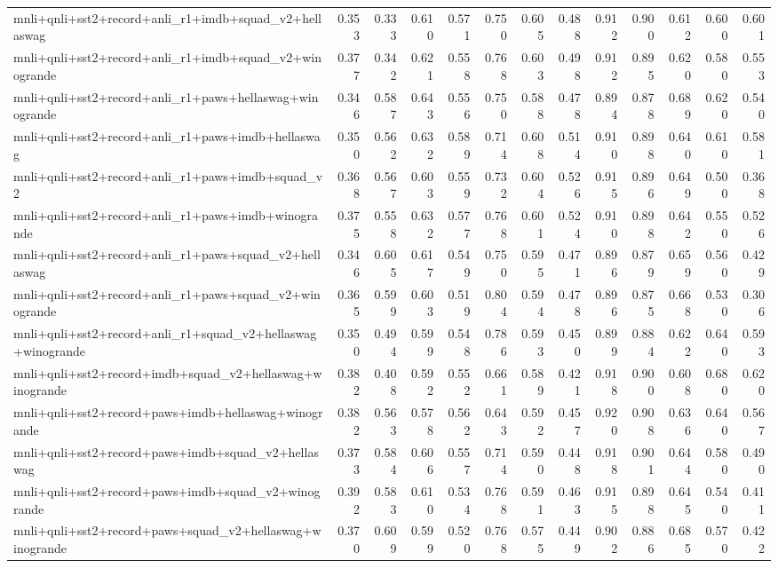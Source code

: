 \begin{table}[t]
\begin{tabular}{lrrrrrrrrrrrr}
    mnli+qnli+sst2+record+anli\_r1+imdb+squad\_v2+hellaswag & 0.353 & 0.333 & 0.610 & 0.571 & 0.750 & 0.605 & 0.488 & 0.912 & 0.900 & 0.612 & 0.600 & 0.601 \\
    mnli+qnli+sst2+record+anli\_r1+imdb+squad\_v2+winogrande & 0.377 & 0.342 & 0.621 & 0.558 & 0.768 & 0.603 & 0.498 & 0.912 & 0.895 & 0.620 & 0.580 & 0.553 \\
    mnli+qnli+sst2+record+anli\_r1+paws+hellaswag+winogrande & 0.346 & 0.587 & 0.643 & 0.556 & 0.750 & 0.588 & 0.478 & 0.894 & 0.878 & 0.689 & 0.620 & 0.540 \\
    mnli+qnli+sst2+record+anli\_r1+paws+imdb+hellaswag & 0.350 & 0.562 & 0.632 & 0.589 & 0.714 & 0.608 & 0.514 & 0.910 & 0.898 & 0.640 & 0.610 & 0.581 \\
    mnli+qnli+sst2+record+anli\_r1+paws+imdb+squad\_v2 & 0.368 & 0.567 & 0.603 & 0.559 & 0.732 & 0.604 & 0.526 & 0.915 & 0.896 & 0.649 & 0.500 & 0.368 \\
    mnli+qnli+sst2+record+anli\_r1+paws+imdb+winogrande & 0.375 & 0.558 & 0.632 & 0.577 & 0.768 & 0.601 & 0.524 & 0.910 & 0.898 & 0.642 & 0.550 & 0.526 \\
    mnli+qnli+sst2+record+anli\_r1+paws+squad\_v2+hellaswag & 0.346 & 0.605 & 0.617 & 0.549 & 0.750 & 0.595 & 0.471 & 0.896 & 0.879 & 0.659 & 0.560 & 0.429 \\
    mnli+qnli+sst2+record+anli\_r1+paws+squad\_v2+winogrande & 0.365 & 0.599 & 0.603 & 0.519 & 0.804 & 0.594 & 0.478 & 0.896 & 0.875 & 0.668 & 0.530 & 0.306 \\
    mnli+qnli+sst2+record+anli\_r1+squad\_v2+hellaswag+winogrande & 0.350 & 0.494 & 0.599 & 0.548 & 0.786 & 0.593 & 0.450 & 0.899 & 0.884 & 0.622 & 0.640 & 0.593 \\
    mnli+qnli+sst2+record+imdb+squad\_v2+hellaswag+winogrande & 0.382 & 0.408 & 0.592 & 0.552 & 0.661 & 0.589 & 0.421 & 0.918 & 0.900 & 0.608 & 0.680 & 0.620 \\
    mnli+qnli+sst2+record+paws+imdb+hellaswag+winogrande & 0.382 & 0.563 & 0.578 & 0.562 & 0.643 & 0.592 & 0.457 & 0.920 & 0.908 & 0.636 & 0.640 & 0.567 \\
    mnli+qnli+sst2+record+paws+imdb+squad\_v2+hellaswag & 0.373 & 0.584 & 0.606 & 0.557 & 0.714 & 0.590 & 0.448 & 0.918 & 0.901 & 0.644 & 0.580 & 0.490 \\
    mnli+qnli+sst2+record+paws+imdb+squad\_v2+winogrande & 0.392 & 0.583 & 0.610 & 0.534 & 0.768 & 0.591 & 0.463 & 0.915 & 0.898 & 0.645 & 0.540 & 0.411 \\
    mnli+qnli+sst2+record+paws+squad\_v2+hellaswag+winogrande & 0.370 & 0.609 & 0.599 & 0.520 & 0.768 & 0.575 & 0.449 & 0.902 & 0.886 & 0.685 & 0.570 & 0.422 \\

\end{tabular}
\end{table}
